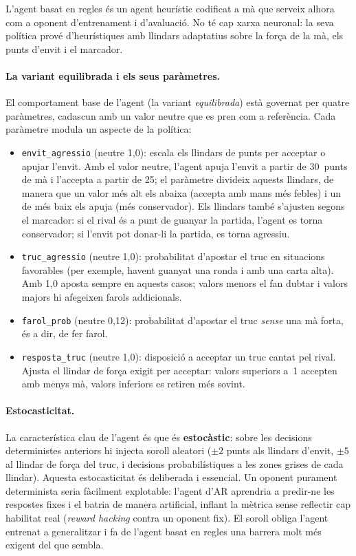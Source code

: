 L'agent basat en regles és un agent
heurístic codificat a mà que serveix alhora com a oponent d'entrenament i d'avaluació.
No té cap xarxa neuronal: la seva política prové d'heurístiques amb llindars adaptatius
sobre la força de la mà, els punts d'envit i el marcador.

\paragraph{La variant equilibrada i els seus paràmetres.} El comportament base de l'agent
(la variant \emph{equilibrada}) està governat per quatre paràmetres, cadascun amb un valor
neutre que es pren com a referència. Cada paràmetre modula un aspecte de la política:

\begin{itemize}
  \item \texttt{envit\_agressio} (neutre 1{,}0): escala els llindars de punts per acceptar
        o apujar l'envit. Amb el valor neutre, l'agent apuja l'envit a partir de
        30~punts de mà i l'accepta a partir de 25; el paràmetre divideix aquests
        llindars, de manera que un valor més alt els abaixa (accepta amb mans més febles)
        i un de més baix els apuja (més conservador). Els llindars també s'ajusten segons
        el marcador: si el rival és a punt de guanyar la partida, l'agent es torna
        conservador; si l'envit pot donar-li la partida, es torna agressiu.
  \item \texttt{truc\_agressio} (neutre 1{,}0): probabilitat d'apostar el truc en
        situacions favorables (per exemple, havent guanyat una ronda i amb una carta
        alta). Amb 1{,}0 aposta sempre en aquests casos; valors menors el fan dubtar i
        valors majors hi afegeixen farols addicionals.
  \item \texttt{farol\_prob} (neutre 0{,}12): probabilitat d'apostar el truc \emph{sense}
        una mà forta, és a dir, de fer farol.
  \item \texttt{resposta\_truc} (neutre 1{,}0): disposició a acceptar un truc cantat pel
        rival. Ajusta el llindar de força exigit per acceptar: valors superiors a~1
        accepten amb menys mà, valors inferiors es retiren més sovint.
\end{itemize}

\paragraph{Estocasticitat.} La característica clau de l'agent és que és
\textbf{estocàstic}: sobre les decisions deterministes anteriors hi injecta soroll
aleatori ($\pm2$ punts als llindars d'envit, $\pm5$ al llindar de força del truc, i
decisions probabilístiques a les zones grises de cada llindar). Aquesta estocasticitat és
deliberada i essencial. Un oponent purament determinista seria fàcilment explotable:
l'agent d'\ac{AR} aprendria a predir-ne les respostes fixes i el batria de manera
artificial, inflant la mètrica sense reflectir cap habilitat real (\emph{reward hacking}
contra un oponent fix). El soroll obliga l'agent entrenat a generalitzar i fa de
l'agent basat en regles una barrera molt més exigent del que sembla.

